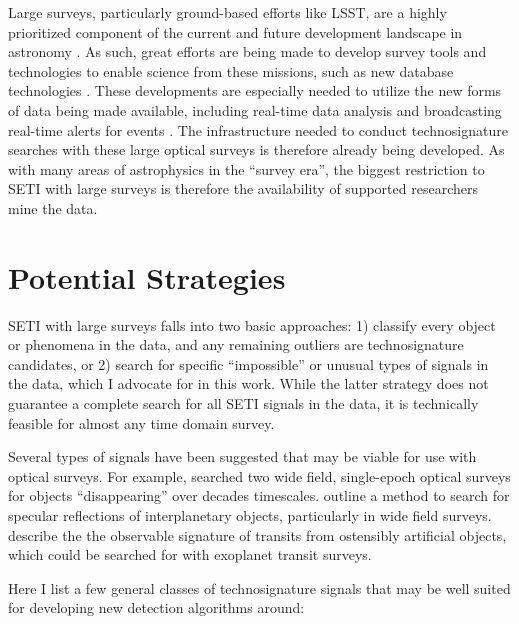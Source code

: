 \documentclass[twocolumn]{aastex62}
\begin{document}
Large surveys, particularly ground-based efforts like LSST, are a highly prioritized component of the current and future development landscape in astronomy \citep{astro2010}. As such, great efforts are being made to develop survey tools and technologies to enable science from these missions, such as new database technologies \citep{juric2012}. These developments are especially needed to utilize the new forms of data being made available, including real-time data analysis \citep[e.g.][]{schwamb2019} and broadcasting real-time alerts for events \citep{patterson2019}.
The infrastructure needed to conduct technosignature searches with these large optical surveys is therefore already being developed. As with many areas of astrophysics in the ``survey era'', the biggest restriction to SETI with large surveys is therefore the availability of supported researchers mine the data.




\section{Potential Strategies}
\label{sec:strategy}

SETI with large surveys falls into two basic approaches: 1) classify every object or phenomena in the data, and any remaining outliers are technosignature candidates, or 2) search for specific ``impossible'' or unusual types of signals in the data, which I advocate for in this work. While the latter strategy does not guarantee a complete search for all SETI signals in the data, it is technically feasible for almost any time domain survey. 

Several types of signals have been suggested that may be viable for use with optical surveys. For example, \citet{villarroel2016} searched two wide field, single-epoch optical surveys for objects ``disappearing''  over decades timescales. \citet{lacki2019} outline a method to search for specular reflections of interplanetary objects, particularly in wide field surveys. \citet{arnold2005} describe the the observable signature of transits from ostensibly artificial objects, which could be searched for with exoplanet transit surveys.

Here I list a few general classes of technosignature signals that may be well suited for developing new detection algorithms around:
\end{document}

